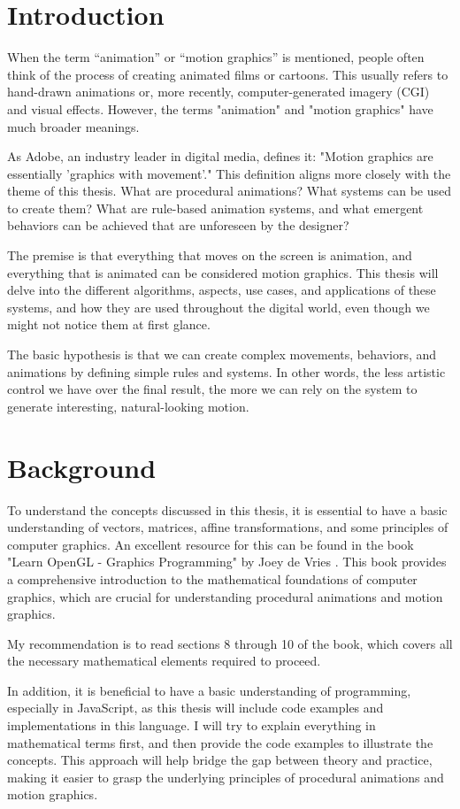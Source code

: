 \section{Introduction}
\label{sec:intro}

When the term ``animation'' or ``motion graphics'' is mentioned, people often think of the process of creating animated films or cartoons. This usually refers to hand-drawn animations or, more recently, computer-generated imagery (CGI) and visual effects. However, the terms "animation" and "motion graphics" have much broader meanings.

As Adobe, an industry leader in digital media, defines it: "Motion graphics are essentially 'graphics with movement'." \cite{adobe-motion-graphics} This definition aligns more closely with the theme of this thesis. What are procedural animations? What systems can be used to create them? What are rule-based animation systems, and what emergent behaviors can be achieved that are unforeseen by the designer?

The premise is that everything that moves on the screen is animation, and everything that is animated can be considered motion graphics. This thesis will delve into the different algorithms, aspects, use cases, and applications of these systems, and how they are used throughout the digital world, even though we might not notice them at first glance.

The basic hypothesis is that we can create complex movements, behaviors, and animations by defining simple rules and systems. In other words, the less artistic control we have over the final result, the more we can rely on the system to generate interesting, natural-looking motion.

\section{Background}
\label{sec:background}

To understand the concepts discussed in this thesis, it is essential to have a basic understanding of vectors, matrices, affine transformations, and some principles of computer graphics. An excellent resource for this can be found in the book "Learn OpenGL - Graphics Programming" by Joey de Vries \cite{learn-opengl}. This book provides a comprehensive introduction to the mathematical foundations of computer graphics, which are crucial for understanding procedural animations and motion graphics.

My recommendation is to read sections 8 through 10 of the book, which covers all the necessary mathematical elements required to proceed.

In addition, it is beneficial to have a basic understanding of programming, especially in JavaScript, as this thesis will include code examples and implementations in this language. I will try to explain everything in mathematical terms first, and then provide the code examples to illustrate the concepts. This approach will help bridge the gap between theory and practice, making it easier to grasp the underlying principles of procedural animations and motion graphics.
